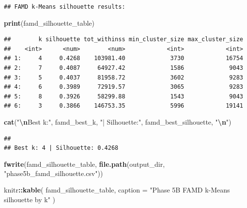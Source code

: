 \documentclass[
]{article}
\newenvironment{Shaded}{\begin{snugshade}}{\end{snugshade}}
\newcommand{\AttributeTok}[1]{\textcolor[rgb]{0.13,0.29,0.53}{#1}}
\newcommand{\DecValTok}[1]{\textcolor[rgb]{0.00,0.00,0.81}{#1}}
\newcommand{\FunctionTok}[1]{\textcolor[rgb]{0.13,0.29,0.53}{\textbf{#1}}}
\newcommand{\NormalTok}[1]{#1}
\newcommand{\OtherTok}[1]{\textcolor[rgb]{0.56,0.35,0.01}{#1}}
\newcommand{\SpecialCharTok}[1]{\textcolor[rgb]{0.81,0.36,0.00}{\textbf{#1}}}
\newcommand{\StringTok}[1]{\textcolor[rgb]{0.31,0.60,0.02}{#1}}
\begin{document}
\begin{Shaded}
\end{Shaded}

\begin{verbatim}
## FAMD k-Means silhouette results:
\end{verbatim}

\begin{Shaded}
\begin{Highlighting}[]
\FunctionTok{print}\NormalTok{(famd\_silhouette\_table)}
\end{Highlighting}
\end{Shaded}

\begin{verbatim}
##        k silhouette tot_withinss min_cluster_size max_cluster_size
##    <int>      <num>        <num>            <int>            <int>
## 1:     4     0.4268    103981.40             3730            16754
## 2:     7     0.4087     64927.42             1586             9043
## 3:     5     0.4037     81958.72             3602             9283
## 4:     6     0.3989     72919.57             3065             9283
## 5:     8     0.3926     58299.88             1543             9043
## 6:     3     0.3866    146753.35             5996            19141
\end{verbatim}

\begin{Shaded}
\begin{Highlighting}[]
\FunctionTok{cat}\NormalTok{(}\StringTok{"}\SpecialCharTok{\textbackslash{}n}\StringTok{Best k:"}\NormalTok{, famd\_best\_k, }\StringTok{"| Silhouette:"}\NormalTok{, famd\_best\_silhouette, }\StringTok{"}\SpecialCharTok{\textbackslash{}n}\StringTok{"}\NormalTok{)}
\end{Highlighting}
\end{Shaded}

\begin{verbatim}
## 
## Best k: 4 | Silhouette: 0.4268
\end{verbatim}

\begin{Shaded}
\begin{Highlighting}[]
\FunctionTok{fwrite}\NormalTok{(famd\_silhouette\_table, }\FunctionTok{file.path}\NormalTok{(output\_dir, }\StringTok{"phase5b\_famd\_silhouette.csv"}\NormalTok{))}

\NormalTok{knitr}\SpecialCharTok{::}\FunctionTok{kable}\NormalTok{(}
\NormalTok{  famd\_silhouette\_table,}
  \AttributeTok{caption =} \StringTok{"Phase 5B FAMD k{-}Means silhouette by k"}
\NormalTok{)}
\end{Highlighting}
\end{Shaded}
\end{document}
